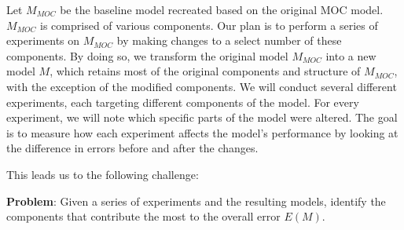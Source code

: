 Let $M_{MOC}$ be the baseline model recreated based on the original MOC model. $M_{MOC}$ is comprised of various components.
Our plan is to perform a series of experiments on $M_{MOC}$ by making changes to a select number of these components.
By doing so, we transform the original model $M_{MOC}$ into a new model $M$, which retains most of the original components and structure of $M_{MOC}$, with the exception of the modified components.
We will conduct several different experiments, each targeting different components of the model.
For every experiment, we will note which specific parts of the model were altered.
The goal is to measure how each experiment affects the model's performance by looking at the difference in errors before and after the changes.

This leads us to the following challenge:

\textbf{Problem}: Given a series of experiments and the resulting models, identify the components that contribute the most to the overall error $E(M)$. 
